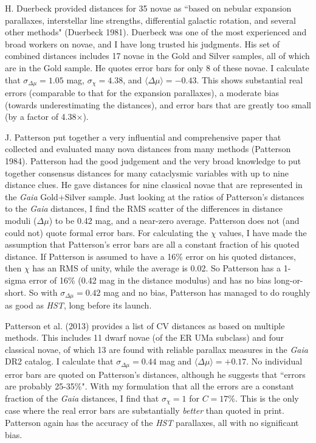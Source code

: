 \documentclass[a4paper,fleqn,usenatbib]{mnras}
\begin{document}
H. Duerbeck provided distances for 35 novae as ``based on nebular expansion parallaxes, interstellar line strengths, differential galactic rotation, and several other methods"  (Duerbeck 1981).  Duerbeck was one of the most experienced and broad workers on novae, and I have long trusted his judgments.  His set of combined distances includes 17 novae in the Gold and Silver samples, all of which are in the Gold sample.  He quotes error bars for only 8 of these novae.  I calculate that $\sigma _{\Delta \mu} = 1.05$ mag, $\sigma _{\chi} = 4.38$, and $\langle \Delta \mu \rangle = -0.43$.  This shows substantial real errors (comparable to that for the expansion parallaxes), a moderate bias (towards underestimating the distances), and error bars that are greatly too small (by a factor of 4.38$\times$).

J. Patterson put together a very influential and comprehensive paper that collected and evaluated many nova distances from many methods (Patterson 1984).  Patterson had the good judgement and the very broad knowledge to put together consensus distances for many cataclysmic variables with up to nine distance clues.  He gave distances for nine classical novae that are represented in the {\it Gaia} Gold+Silver sample.  Just looking at the ratios of Patterson's distances to the {\it Gaia} distances, I find the RMS scatter of the differences in distance moduli ($\Delta \mu$) to be 0.42 mag, and a near-zero average.  Patterson does not (and could not) quote formal error bars.  For calculating the $\chi$ values, I have made the assumption that Patterson's error bars are all a constant fraction of his quoted distance.  If Patterson is assumed to have a 16\% error on his quoted distances, then $\chi$ has an RMS of unity, while the average is 0.02.  So Patterson has a 1-sigma error of 16\% (0.42 mag in the distance modulus) and has no bias long-or-short.  So with $\sigma _{\Delta \mu} = 0.42$ mag and no bias, Patterson has managed to do roughly as good as {\it HST}, long before its launch.

Patterson et al. (2013) provides a list of CV distances as based on multiple methods.  This includes 11 dwarf novae (of the ER UMa subclass) and four classical novae, of which 13 are found with reliable parallax measures in the {\it Gaia} DR2 catalog.  I calculate that $\sigma _{\Delta \mu} = 0.44$ mag and $\langle \Delta \mu \rangle = +0.17$.  No individual error bars are quoted on Patterson's distances, although he suggests that ``errors are probably 25-35\%".  With my formulation that all the errors are a constant fraction of the {\it Gaia} distances, I find that $\sigma _{\chi} = 1$ for $C=17$\%.  This is the only case where the real error bars are substantially {\it better} than quoted in print.  Patterson again has the accuracy of the {\it HST} parallaxes, all with no significant bias.
\end{document}
